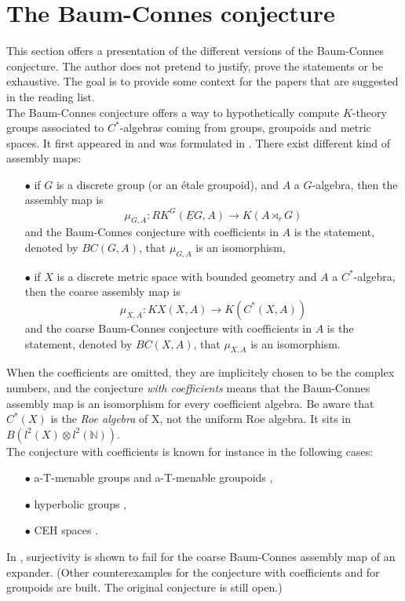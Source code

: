 \section{The Baum-Connes conjecture}

This section offers a presentation of the different versions of the Baum-Connes conjecture. The author does not pretend to justify, prove the statements or be exhaustive. The goal is to provide some context for the papers that are suggested in the reading list. \\

The Baum-Connes conjecture offers a way to hypothetically compute $K$-theory groups associated to $C^*$-algebras coming from groups, groupoids and metric spaces. It first appeared in \cite{BaumConnes} and was formulated in \cite{BaumConnesHigson}. There exist different kind of assembly maps:
\begin{itemize}
\item[$\bullet$] if $G$ is a discrete group (or an \'etale groupoid), and $A$ a $G$-algebra, then the assembly map is
\[\mu_{G,A}: RK^G(\underline E G , A) \rightarrow K(A\rtimes_r G)\]
and the Baum-Connes conjecture with coefficients in $A$ is the statement, denoted by $BC(G,A)$, that $\mu_{G,A}$ is an isomorphism,
\item[$\bullet$] if $X$ is a discrete metric space with bounded geometry and $A$ a $C^*$-algebra, then the coarse assembly map is
\[\mu_{X,A}: KX(X , A) \rightarrow K(C^*(X,A))\]
and the coarse Baum-Connes conjecture with coefficients in $A$ is the statement, denoted by $BC(X,A)$, that $\mu_{X,A}$ is an isomorphism.
\end{itemize}
When the coefficients are omitted, they are implicitely chosen to be the complex numbers, and the conjecture \textit{with coefficients} means that the Baum-Connes assembly map is an isomorphism for every coefficient algebra. Be aware that $C^*(X)$ is the \textit{Roe algebra} of X, not the uniform Roe algebra. It sits in $B(l^2(X) \otimes l^2(\mathbb N))$. \\

The conjecture with coefficients is known for instance in the following cases:
\begin{itemize}
\item[$\bullet$] a-T-menable groups \cite{HigsonKasparov} and a-T-menable groupoids \cite{Tu},
\item[$\bullet$] hyperbolic groups \cite{LafforgueHyperbolic},
\item[$\bullet$] CEH spaces \cite{Yu2}.
\end{itemize} 
In \cite{HLS}, surjectivity is shown to fail for the coarse Baum-Connes assembly map of an expander. (Other counterexamples for the conjecture with coefficients and for groupoids are built. The original conjecture is still open.)\\

